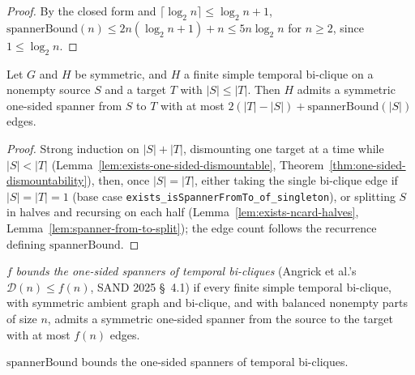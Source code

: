 \begin{proof}
  \leanok
  By the closed form and $\lceil \log_2 n\rceil \le \log_2 n + 1$, $\mathrm{spannerBound}(n) \le 2n(\log_2 n + 1) + n \le 5 n \log_2 n$ for $n \ge 2$, since $1 \le \log_2 n$.
\end{proof}

\begin{theorem}
  \label{thm:exists-spanner-from-to-ncard-le}
  \leanok
  Let $G$ and $H$ be symmetric, and $H$ a finite simple temporal bi-clique on a
  nonempty source $S$ and a target $T$ with $|S| \le |T|$. Then $H$ admits a
  symmetric one-sided spanner from $S$ to $T$ with at most
  $2(|T| - |S|) + \mathrm{spannerBound}(|S|)$ edges.
\end{theorem}

\begin{proof}
  \leanok
  Strong induction on $|S| + |T|$, dismounting one target at a time while
  $|S| < |T|$ (Lemma~\ref{lem:exists-one-sided-dismountable},
  Theorem~\ref{thm:one-sided-dismountability}), then, once $|S| = |T|$,
  either taking the single bi-clique edge if $|S| = |T| = 1$ (base case
  \texttt{exists\_isSpannerFromTo\_of\_singleton}), or splitting
  $S$ in halves and recursing on each half (Lemma~\ref{lem:exists-ncard-halves},
  Lemma~\ref{lem:spanner-from-to-split}); the edge count follows the recurrence
  defining $\mathrm{spannerBound}$.
\end{proof}

\begin{definition}
  \label{def:one-sided-spanner-bound}
  \leanok
  $f$ \emph{bounds the one-sided spanners of temporal bi-cliques} (Angrick et
  al.'s $\mathcal{D}(n) \le f(n)$, SAND 2025 \S~4.1) if every finite simple
  temporal bi-clique, with symmetric ambient graph and bi-clique, and with
  balanced nonempty parts of size $n$, admits a symmetric one-sided spanner
  from the source to the target with at most $f(n)$ edges.
\end{definition}

\begin{lemma}
  \label{lem:one-sided-spanner-bound-spannerBound}
  \leanok
  $\mathrm{spannerBound}$ bounds the one-sided spanners of temporal
  bi-cliques.
\end{lemma}

